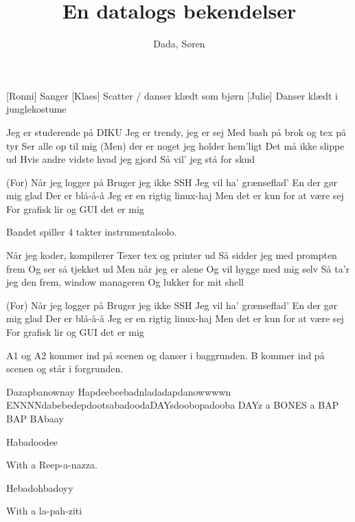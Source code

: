 \documentclass[a4paper,11pt]{article}
\title{En datalogs bekendelser}
\author{Dada, Søren}
\begin{document}
\maketitle

\begin{roles}  
  [Ronni] Sanger
  [Klaes] Scatter / danser klædt som bjørn
  [Julie] Danser klædt i junglekostume
\end{roles}

\begin{props}
\end{props}

\begin{song}
   Jeg er studerende på DIKU
  Jeg er trendy, jeg er sej
  Med bash på brok og tex på tyr
  Ser alle op til mig
  (Men) der er noget jeg holder hem'ligt
  Det må ikke slippe ud
  Hvis andre vidste hvad jeg gjord
  Så vil' jeg stå for skud

   (For) Når jeg logger på
  Bruger jeg ikke SSH
  Jeg vil ha' grænseflad'
  En der gør mig glad
  Der er blå-å-å
  Jeg er en rigtig linux-haj
  Men det er kun for at være sej
  For grafisk lir og GUI det er mig

  \scene Bandet spiller 4 takter instrumentalsolo.

   Når jeg koder, kompilerer
  Texer tex og printer ud
  Så sidder jeg med prompten frem
  Og ser så tjekket ud
  Men når jeg er alene
  Og vil hygge med mig selv
  Så ta'r jeg den frem, window manageren
  Og lukker for mit shell

   (For) Når jeg logger på
  Bruger jeg ikke SSH
  Jeg vil ha' grænseflad'
  En der gør mig glad
  Der er blå-å-å
  Jeg er en rigtig linux-haj
  Men det er kun for at være sej
  For grafisk lir og GUI det er mig

  \scene A1 og A2 kommer ind på scenen og danser i baggrunden. B kommer ind på scenen og står i forgrunden.

   Dazapbanownay
  Hapdeebeebadnladadapdanowwwwn
  ENNNNdabebedepdootsabadoodaDAYsdoobopadooba DAYz a BONES a BAP BAP BAbaay
  
   Habadoodee

   With a Reep-a-nazza.

   Hebadohbadoyy

   With a la-pah-ziti


\end{song}
\end{document}

